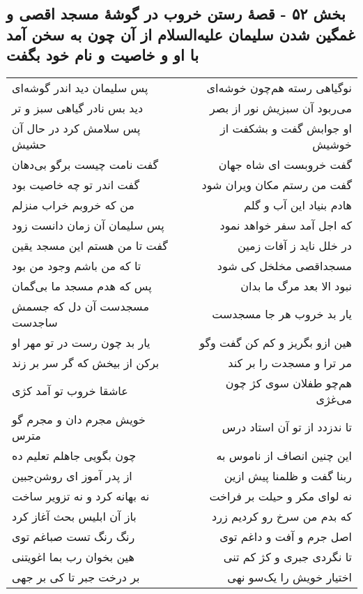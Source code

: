 \begin{center}
\section*{بخش ۵۲ - قصهٔ رستن خروب در گوشهٔ مسجد اقصی و غمگین شدن سلیمان علیه‌السلام از آن چون به سخن آمد با او و خاصیت و نام  خود بگفت}
\label{sec:sh052}
\begin{longtable}{l p{0.5cm} r}
پس سلیمان دید اندر گوشه‌ای
&&
نوگیاهی رسته هم‌چون خوشه‌ای
\\
دید بس نادر گیاهی سبز و تر
&&
می‌ربود آن سبزیش نور از بصر
\\
پس سلامش کرد در حال آن حشیش
&&
او جوابش گفت و بشکفت از خوشیش
\\
گفت نامت چیست برگو بی‌دهان
&&
گفت خروبست ای شاه جهان
\\
گفت اندر تو چه خاصیت بود
&&
گفت من رستم مکان ویران شود
\\
من که خروبم خراب منزلم
&&
هادم بنیاد این آب و گلم
\\
پس سلیمان آن زمان دانست زود
&&
که اجل آمد سفر خواهد نمود
\\
گفت تا من هستم این مسجد یقین
&&
در خلل ناید ز آفات زمین
\\
تا که من باشم وجود من بود
&&
مسجداقصی مخلخل کی شود
\\
پس که هدم مسجد ما بی‌گمان
&&
نبود الا بعد مرگ ما بدان
\\
مسجدست آن دل که جسمش ساجدست
&&
یار بد خروب هر جا مسجدست
\\
یار بد چون رست در تو مهر او
&&
هین ازو بگریز و کم کن گفت وگو
\\
برکن از بیخش که گر سر بر زند
&&
مر ترا و مسجدت را بر کند
\\
عاشقا خروب تو آمد کژی
&&
هم‌چو طفلان سوی کژ چون می‌غژی
\\
خویش مجرم دان و مجرم گو مترس
&&
تا ندزدد از تو آن استاد درس
\\
چون بگویی جاهلم تعلیم ده
&&
این چنین انصاف از ناموس به
\\
از پدر آموز ای روشن‌جبین
&&
ربنا گفت و ظلمنا پیش ازین
\\
نه بهانه کرد و نه تزویر ساخت
&&
نه لوای مکر و حیلت بر فراخت
\\
باز آن ابلیس بحث آغاز کرد
&&
که بدم من سرخ رو کردیم زرد
\\
رنگ رنگ تست صباغم توی
&&
اصل جرم و آفت و داغم توی
\\
هین بخوان رب بما اغویتنی
&&
تا نگردی جبری و کژ کم تنی
\\
بر درخت جبر تا کی بر جهی
&&
اختیار خویش را یک‌سو نهی

\end{longtable}
\end{center}
